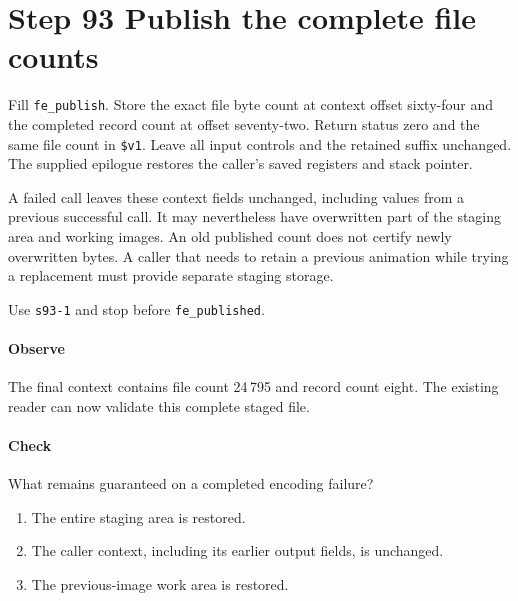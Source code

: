 \section{Step 93 Publish the complete file counts}
Fill \texttt{fe\_publish}. Store the exact file byte count at context offset sixty-four and the completed record count at offset seventy-two. Return status zero and the same file count in \texttt{\$v1}. Leave all input controls and the retained suffix unchanged. The supplied epilogue restores the caller's saved registers and stack pointer.

A failed call leaves these context fields unchanged, including values from a previous successful call. It may nevertheless have overwritten part of the staging area and working images. An old published count does not certify newly overwritten bytes. A caller that needs to retain a previous animation while trying a replacement must provide separate staging storage.

Use \texttt{s93-1} and stop before \texttt{fe\_published}.

\paragraph{Observe} The final context contains file count 24\,795 and record count eight. The existing reader can now validate this complete staged file.

\paragraph{Check} What remains guaranteed on a completed encoding failure?
\begin{enumerate}[label=\Alph*.]
  \item The entire staging area is restored.
  \item The caller context, including its earlier output fields, is unchanged.
  \item The previous-image work area is restored.
\end{enumerate}
